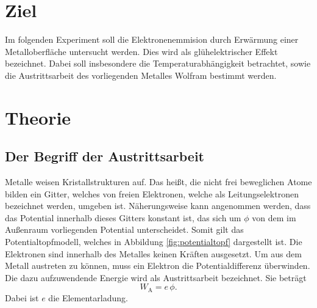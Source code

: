 \section{Ziel}
\label{sec:Ziel}
Im folgenden Experiment soll die Elektronenemmision durch Erwärmung einer Metalloberfläche untersucht werden. Dies wird als glühelektrischer Effekt bezeichnet. Dabei soll insbesondere die Temperaturabhängigkeit betrachtet, sowie die Austrittsarbeit des vorliegenden Metalles Wolfram bestimmt werden.

\section{Theorie}
\label{sec:theorie}

\subsection{Der Begriff der Austrittsarbeit}

Metalle weisen Kristallstrukturen auf. Das heißt, die nicht frei beweglichen Atome bilden ein Gitter, welches von freien Elektronen, welche als Leitungselektronen bezeichnet werden, umgeben ist. Näherungsweise kann angenommen werden, dass das Potential innerhalb dieses Gitters konstant ist, das sich um $\phi$ von dem im Außenraum vorliegenden Potential unterscheidet. Somit gilt das Potentialtopfmodell, welches in Abbildung \ref{fig:potentialtopf} dargestellt ist. Die Elektronen sind innerhalb des Metalles keinen Kräften ausgesetzt. Um aus dem Metall austreten zu können, muss ein Elektron die Potentialdifferenz überwinden. Die dazu aufzuwendende Energie wird als Austrittsarbeit bezeichnet. Sie beträgt
\begin{equation}
  W_\mathrm{A}= e \,\phi.
\end{equation}
Dabei ist $e$ die Elementarladung.

